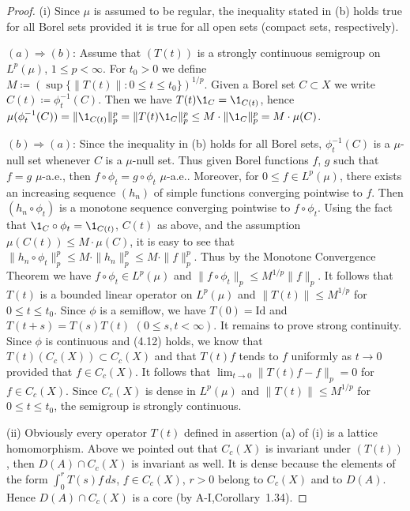 \begin{proof}
(i) Since $\mu$ is assumed to be regular, the inequality stated
in (b) holds true for all Borel sets provided it is true for all
open sets (compact sets, respectively).

$(a)\Rightarrow(b)$: Assume that $(T(t))$ is a strongly continuous semigroup on
$L^p(\mu)$, $1 \leq p < \infty$. For $t_0 > 0$ we define $M \coloneqq  (\sup\{\|T(t)\| \colon 0 \leq t \leq t_0\})^{1/p}$.
Given a Borel set $C \subset X$ we write $C(t) \coloneqq  \phi_t^{-1}(C)$.
Then we have $T(t)\1_C = \1_{C(t)}$, hence
$\mu(\phi_t^{-1}(C)) = \|\1_{C(t)}\|_p^p = \|T(t)\1_C\|_p^p \leq M \cdot \|\1_C\|_p^p = M \cdot \mu(C)$.

$(b)\Rightarrow(a)$: Since the inequality in (b) holds for all Borel sets,
$\phi_t^{-1}(C)$ is a $\mu$-null set whenever $C$ is a $\mu$-null set. Thus given
Borel functions $f$, $g$ such that $f = g$ $\mu$-a.e., then $f \circ \phi_t = g \circ \phi_t$
$\mu$-a.e.. Moreover, for $0 \leq f \in L^p(\mu)$, there exists an increasing
sequence $(h_n)$ of simple functions converging pointwise to $f$. Then
$(h_n \circ \phi_t)$ is a monotone sequence converging pointwise to $f \circ \phi_t$. Using
the fact that $\1_C \circ \phi_t = \1_{C(t)}$, $C(t)$ as above, and the assumption
$\mu(C(t)) \leq M \cdot \mu(C)$, it is easy to see that $\|h_n \circ \phi_t\|_p^p \leq M \cdot \|h_n\|_p^p \leq M \cdot \|f\|_p^p$.
Thus by the Monotone Convergence Theorem we have $f \circ \phi_t \in L^p(\mu)$ and
$\|f \circ \phi_t\|_p \leq M^{1/p}\|f\|_p$. It follows that $T(t)$ is a bounded linear
operator on $L^p(\mu)$ and $\|T(t)\| \leq M^{1/p}$ for $0 \leq t \leq t_0$. Since $\phi$ is a
semiflow, we have $T(0) = \text{Id}$ and $T(t+s) = T(s)T(t)$ $(0 \leq s,t < \infty)$. It
remains to prove strong continuity. Since $\phi$ is continuous and (4.12)
holds, we know that $T(t)(C_c(X)) \subset C_c(X)$ and that $T(t)f$ tends to $f$
uniformly as $t \to 0$ provided that $f \in C_c(X)$. It follows that
$\lim_{t \to 0}\|T(t)f - f\|_p = 0$ for $f \in C_c(X)$. Since $C_c(X)$ is dense in
$L^p(\mu)$ and $\|T(t)\| \leq M^{1/p}$ for $0 \leq t \leq t_0$, the semigroup is strongly
continuous.

(ii) Obviously every operator $T(t)$ defined in assertion (a) of (i)
is a lattice homomorphism. Above we pointed out that $C_c(X)$ is
%
%
%
%
invariant under $(T(t))$, then $D(A) \cap C_c(X)$ is invariant as well. It
is dense because the elements of the form $\int_{0}^{r} T(s)f \, ds$, $f \in C_c(X)$,
$r > 0$ belong to $C_c(X)$ and to $D(A)$. Hence $D(A) \cap C_c(X)$ is a core
(by A-I,Corollary~1.34).
\end{proof}

